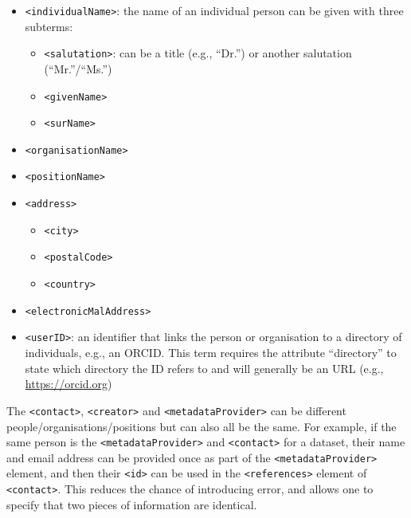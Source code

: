 \documentclass[
]{book}
\providecommand{\tightlist}{%
  \setlength{\itemsep}{0pt}\setlength{\parskip}{0pt}}
\begin{document}
\begin{itemize}
\item
  \texttt{\textless{}individualName\textgreater{}}: the name of an individual person can be given with three subterms:

  \begin{itemize}
  \tightlist
  \item
    \texttt{\textless{}salutation\textgreater{}}: can be a title (e.g., ``Dr.'') or another salutation (``Mr.''/``Ms.'')
  \item
    \texttt{\textless{}givenName\textgreater{}}
  \item
    \texttt{\textless{}surName\textgreater{}}
  \end{itemize}
\item
  \texttt{\textless{}organisationName\textgreater{}}
\item
  \texttt{\textless{}positionName\textgreater{}}
\item
  \texttt{\textless{}address\textgreater{}}

  \begin{itemize}
  \tightlist
  \item
    \texttt{\textless{}city\textgreater{}}
  \item
    \texttt{\textless{}postalCode\textgreater{}}
  \item
    \texttt{\textless{}country\textgreater{}}
  \end{itemize}
\item
  \texttt{\textless{}electronicMalAddress\textgreater{}}
\item
  \texttt{\textless{}userID\textgreater{}}: an identifier that links the person or organisation to a directory of individuals, e.g., an ORCID. This term requires the attribute ``directory'' to state which directory the ID refers to and will generally be an URL (e.g., \url{https://orcid.org})
\end{itemize}

The \texttt{\textless{}contact\textgreater{}}, \texttt{\textless{}creator\textgreater{}} and \texttt{\textless{}metadataProvider\textgreater{}} can be different people/organisations/positions but can also all be the same. For example, if the same person is the \texttt{\textless{}metadataProvider\textgreater{}} and \texttt{\textless{}contact\textgreater{}} for a dataset, their name and email address can be provided once as part of the \texttt{\textless{}metadataProvider\textgreater{}} element, and then their \texttt{\textless{}id\textgreater{}} can be used in the \texttt{\textless{}references\textgreater{}} element of \texttt{\textless{}contact\textgreater{}}. This reduces the chance of introducing error, and allows one to specify that two pieces of information are identical.
\end{document}
